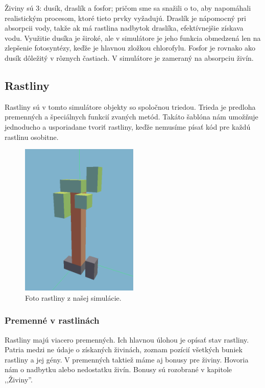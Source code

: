 \documentclass[12pt]{article}
\begin{document}
Živiny sú 3: dusík, draslík a fosfor; pričom sme sa snažili o to, aby napomáhali
realistickým procesom, ktoré tieto prvky vyžadujú.
Draslík je nápomocný pri absorpcii vody, takže ak má rastlina nadbytok draslíka,
efektívnejšie získava vodu. Využitie dusíka je široké, ale v simulátore
je jeho funkcia obmedzená len na zlepšenie fotosyntézy, keďže je hlavnou
zložkou chlorofylu. Fosfor je rovnako ako dusík dôležitý v rôznych častiach.
V simulátore je zameraný na absorpciu živín.

\newpage
\subsection{Rastliny}

Rastliny sú v tomto simulátore objekty so spoločnou triedou. Trieda je
predloha premenných a špeciálnych funkcií zvaných metód. Takáto šablóna nám umožňuje
jednoducho a usporiadane tvoriť rastliny, keďže nemusíme písať kód pre každú rastlinu
osobitne.

\begin{figure}[ht]
	\centering
	\includegraphics[width=0.5\textwidth]{res/plant.png}
	\caption{Foto rastliny z našej simulácie.}
\end{figure}

\subsubsection{Premenné v rastlinách}

Rastliny majú viacero premenných. Ich hlavnou úlohou je opísať stav rastliny.
Patria medzi ne údaje o získaných živinách, zoznam pozícií všetkých buniek rastliny
a jej gény. V premenných taktiež máme aj bonusy pre živiny.
Hovoria nám o nadbytku alebo nedostatku živín. Bonusy sú rozobrané v kapitole ,,Živiny''.
\end{document}
